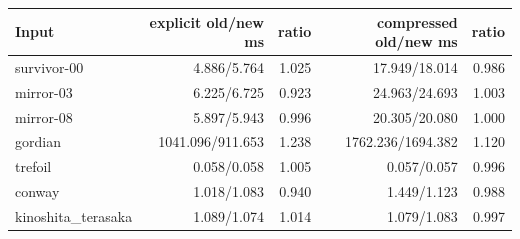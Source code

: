\begin{center}\small
\begin{tabular}{@{}lrrrr@{}}
\toprule
Input & explicit old/new ms & ratio & compressed old/new ms & ratio \\
\midrule
survivor-00 & 4.886/5.764 & 1.025 & 17.949/18.014 & 0.986 \\
mirror-03 & 6.225/6.725 & 0.923 & 24.963/24.693 & 1.003 \\
mirror-08 & 5.897/5.943 & 0.996 & 20.305/20.080 & 1.000 \\
gordian & 1041.096/911.653 & 1.238 & 1762.236/1694.382 & 1.120 \\
trefoil & 0.058/0.058 & 1.005 & 0.057/0.057 & 0.996 \\
conway & 1.018/1.083 & 0.940 & 1.449/1.123 & 0.988 \\
kinoshita\_terasaka & 1.089/1.074 & 1.014 & 1.079/1.083 & 0.997 \\
\bottomrule
\end{tabular}
\end{center}
